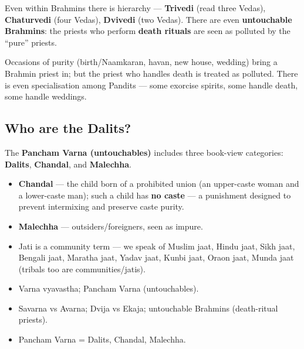 Even within Brahmins there is hierarchy --- \textbf{Trivedi} (read three Vedas), \textbf{Chaturvedi} (four Vedas), \textbf{Dvivedi} (two Vedas). There are even \textbf{untouchable Brahmins}: the priests who perform \textbf{death rituals} are seen as polluted by the ``pure'' priests.

\begin{ExampleBox}
Occasions of purity (birth/Naamkaran, havan, new house, wedding) bring a Brahmin priest in; but the priest who handles death is treated as polluted. There is even specialisation among Pandits --- some exorcise spirits, some handle death, some handle weddings.
\end{ExampleBox}

\subsection{Who are the Dalits?}

\begin{KeyConcept}
The \textbf{Pancham Varna (untouchables)} includes three book-view categories: \textbf{Dalits}, \textbf{Chandal}, and \textbf{Malechha}.
\end{KeyConcept}

\begin{itemize}
\item \textbf{Chandal} --- the child born of a prohibited union (an upper-caste woman and a lower-caste man); such a child has \textbf{no caste} --- a punishment designed to prevent intermixing and preserve caste purity.
\item \textbf{Malechha} --- outsiders/foreigners, seen as impure.
\item Jati is a community term --- we speak of Muslim jaat, Hindu jaat, Sikh jaat, Bengali jaat, Maratha jaat, Yadav jaat, Kunbi jaat, Oraon jaat, Munda jaat (tribals too are communities/jatis).
\end{itemize}

\begin{QuickRevision}
\begin{itemize}
\item Varna vyavastha; Pancham Varna (untouchables).
\item Savarna vs Avarna; Dvija vs Ekaja; untouchable Brahmins (death-ritual priests).
\item Pancham Varna = Dalits, Chandal, Malechha.
\end{itemize}
\end{QuickRevision}

